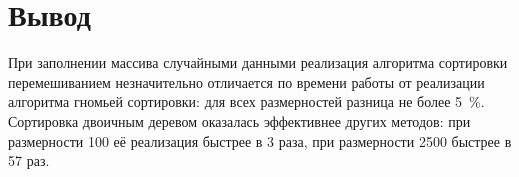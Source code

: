 \section*{Вывод} 
При заполнении массива случайными данными реализация алгоритма сортировки перемешиванием незначительно отличается по времени работы от реализации алгоритма гномьей сортировки: для всех размерностей разница не более 5~\%. Сортировка двоичным деревом  оказалась эффективнее других методов: при размерности 100 её реализация быстрее в 3 раза, при размерности 2500 быстрее в 57 раз.

